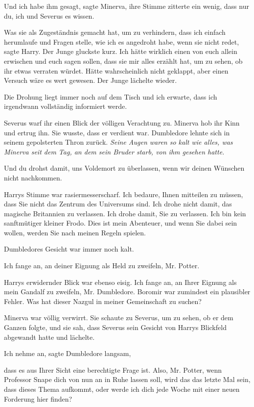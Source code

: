 \glqq Und ich habe ihm gesagt\grqq{}, sagte Minerva, ihre Stimme zitterte ein
wenig, \glqq dass nur du, ich und Severus es wissen.\grqq{}

\glqq Was sie als Zugeständnis gemacht hat, um zu verhindern, dass ich einfach
herumlaufe und Fragen stelle, wie ich es angedroht habe, wenn sie nicht
redet\grqq{}, sagte Harry. Der Junge gluckste kurz. \glqq Ich hätte wirklich
einen von euch allein erwischen und euch sagen sollen, dass sie mir alles
erzählt hat, um zu sehen, ob ihr etwas verraten würdet. Hätte wahrscheinlich
nicht geklappt, aber einen Versuch wäre es wert gewesen.\grqq{} Der Junge
lächelte wieder.

\glqq Die Drohung liegt immer noch auf dem Tisch und ich erwarte, dass ich
irgendwann vollständig informiert werde.\grqq{}

Severus warf ihr einen Blick der völligen Verachtung zu. Minerva hob ihr Kinn
und ertrug ihn. Sie wusste, dass er verdient war. Dumbledore lehnte sich in
seinem gepolsterten Thron zurück. \emph{Seine Augen waren so kalt wie alles, was
Minerva seit dem Tag, an dem sein Bruder starb, von ihm gesehen hatte.}

\glqq Und du drohst damit, uns Voldemort zu überlassen, wenn wir deinen Wünschen
nicht nachkommen.\grqq{}

Harrys Stimme war rasiermesserscharf. \glqq Ich bedaure, Ihnen mitteilen zu
müssen, dass Sie nicht das Zentrum des Universums sind. Ich drohe nicht damit,
das magische Britannien zu verlassen. Ich drohe damit, Sie zu verlassen. Ich bin
kein sanftmütiger kleiner Frodo. Dies ist mein Abenteuer, und wenn Sie dabei
sein wollen, werden Sie nach meinen Regeln spielen.\grqq{}

Dumbledores Gesicht war immer noch kalt.

\glqq Ich fange an, an deiner Eignung als Held zu zweifeln, Mr. Potter.\grqq{}

Harrys erwidernder Blick war ebenso eisig. \glqq Ich fange an, an Ihrer Eignung
als mein Gandalf zu zweifeln, Mr. Dumbledore. Boromir war zumindest ein
plausibler Fehler. Was hat dieser Nazgul in meiner Gemeinschaft zu
suchen?\grqq{}

Minerva war völlig verwirrt. Sie schaute zu Severus, um zu sehen, ob er dem
Ganzen folgte, und sie sah, dass Severus sein Gesicht von Harrys Blickfeld
abgewandt hatte und lächelte.

\glqq Ich nehme an\grqq{}, sagte Dumbledore langsam,

\glqq dass es aus Ihrer Sicht eine berechtigte Frage ist. Also, Mr. Potter, wenn
Professor Snape dich von nun an in Ruhe lassen soll, wird das das letzte Mal
sein, dass dieses Thema aufkommt, oder werde ich dich jede Woche mit einer neuen
Forderung hier finden?\grqq{}

